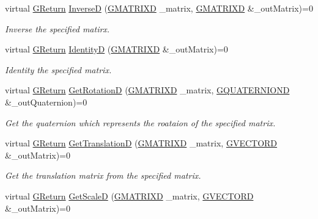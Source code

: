 \begin{DoxyCompactItemize}
virtual \hyperlink{namespaceGW_a67a839e3df7ea8a5c5686613a7a3de21}{G\+Return} \hyperlink{classGW_1_1MATH_1_1GMatrix_ade39ff1c70cb06889196893aad819244}{InverseD} (\hyperlink{structGW_1_1MATH_1_1GMATRIXD}{G\+M\+A\+T\+R\+I\+XD} \+\_\+matrix, \hyperlink{structGW_1_1MATH_1_1GMATRIXD}{G\+M\+A\+T\+R\+I\+XD} \&\+\_\+out\+Matrix)=0
\begin{DoxyCompactList}\small\item\em Inverse the specified matirx. \end{DoxyCompactList}\item 
virtual \hyperlink{namespaceGW_a67a839e3df7ea8a5c5686613a7a3de21}{G\+Return} \hyperlink{classGW_1_1MATH_1_1GMatrix_a3b7136d0cbc99d1a29d159838b5e1d91}{IdentityD} (\hyperlink{structGW_1_1MATH_1_1GMATRIXD}{G\+M\+A\+T\+R\+I\+XD} \&\+\_\+out\+Matrix)=0
\begin{DoxyCompactList}\small\item\em Identity the specified matrix. \end{DoxyCompactList}\item 
virtual \hyperlink{namespaceGW_a67a839e3df7ea8a5c5686613a7a3de21}{G\+Return} \hyperlink{classGW_1_1MATH_1_1GMatrix_aa8a09092d814d7599f2ddedb6a34d1ea}{Get\+RotationD} (\hyperlink{structGW_1_1MATH_1_1GMATRIXD}{G\+M\+A\+T\+R\+I\+XD} \+\_\+matrix, \hyperlink{structGW_1_1MATH_1_1GQUATERNIOND}{G\+Q\+U\+A\+T\+E\+R\+N\+I\+O\+ND} \&\+\_\+out\+Quaternion)=0
\begin{DoxyCompactList}\small\item\em Get the quaternion which represents the roataion of the specified matrix. \end{DoxyCompactList}\item 
virtual \hyperlink{namespaceGW_a67a839e3df7ea8a5c5686613a7a3de21}{G\+Return} \hyperlink{classGW_1_1MATH_1_1GMatrix_a2b2dd5bfce9dc5f567a793ab2a21bb07}{Get\+TranslationD} (\hyperlink{structGW_1_1MATH_1_1GMATRIXD}{G\+M\+A\+T\+R\+I\+XD} \+\_\+matrix, \hyperlink{structGW_1_1MATH_1_1GVECTORD}{G\+V\+E\+C\+T\+O\+RD} \&\+\_\+out\+Matrix)=0
\begin{DoxyCompactList}\small\item\em Get the translation matrix from the specified matrix. \end{DoxyCompactList}\item 
virtual \hyperlink{namespaceGW_a67a839e3df7ea8a5c5686613a7a3de21}{G\+Return} \hyperlink{classGW_1_1MATH_1_1GMatrix_a1d8d370c39617b8ad0fcfb42459fcb09}{Get\+ScaleD} (\hyperlink{structGW_1_1MATH_1_1GMATRIXD}{G\+M\+A\+T\+R\+I\+XD} \+\_\+matrix, \hyperlink{structGW_1_1MATH_1_1GVECTORD}{G\+V\+E\+C\+T\+O\+RD} \&\+\_\+out\+Matrix)=0

\end{DoxyCompactItemize}
